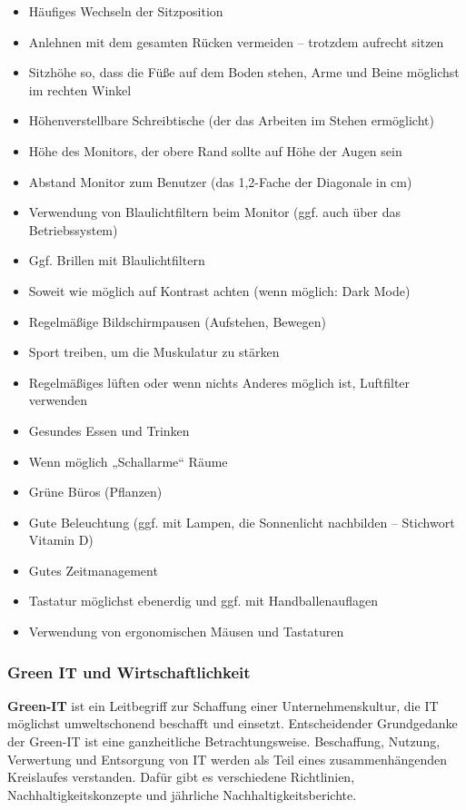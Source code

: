 \documentclass[asp1.tex]{subfiles}
\begin{document}
\begin{itemize}
    \item Häufiges Wechseln der Sitzposition
    \item Anlehnen mit dem gesamten Rücken vermeiden – trotzdem aufrecht sitzen
    \item Sitzhöhe so, dass die Füße auf dem Boden stehen, Arme und Beine möglichst im rechten Winkel
    \item Höhenverstellbare Schreibtische (der das Arbeiten im Stehen ermöglicht)
    \item Höhe des Monitors, der obere Rand sollte auf Höhe der Augen sein
    \item Abstand Monitor zum Benutzer (das 1,2-Fache der Diagonale in cm)
    \item Verwendung von Blaulichtfiltern beim Monitor (ggf. auch über das Betriebssystem)
    \item Ggf. Brillen mit Blaulichtfiltern
    \item Soweit wie möglich auf Kontrast achten (wenn möglich: Dark Mode)
    \item Regelmäßige Bildschirmpausen (Aufstehen, Bewegen)
    \item Sport treiben, um die Muskulatur zu stärken
    \item Regelmäßiges lüften oder wenn nichts Anderes möglich ist, Luftfilter verwenden
    \item Gesundes Essen und Trinken
    \item Wenn möglich „Schallarme“ Räume
    \item Grüne Büros (Pflanzen)
    \item Gute Beleuchtung (ggf. mit Lampen, die Sonnenlicht nachbilden – Stichwort Vitamin D)
    \item Gutes Zeitmanagement
    \item Tastatur möglichst ebenerdig und ggf. mit Handballenauflagen
    \item Verwendung von ergonomischen Mäusen und Tastaturen
\end{itemize}

\subsubsection{Green IT und Wirtschaftlichkeit}

\textbf{Green-IT} ist ein Leitbegriff zur Schaffung einer Unternehmenskultur, die IT möglichst umweltschonend beschafft und einsetzt. Entscheidender Grundgedanke der Green-IT ist eine ganzheitliche Betrachtungsweise. Beschaffung, Nutzung, Verwertung und Entsorgung von IT werden als Teil eines zusammenhängenden Kreislaufes verstanden.
Dafür gibt es verschiedene Richtlinien, Nachhaltigkeitskonzepte und jährliche Nachhaltigkeitsberichte.
\end{document}

